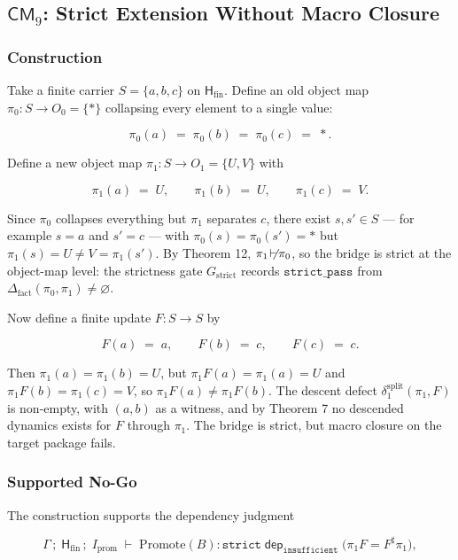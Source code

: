 \documentclass[11pt]{article}
\providecommand{\factor}{\mathrel{\!\vdash\!}}
\theoremstyle{definition}
\begin{document}
\subsection{\texorpdfstring{\(\mathsf{CM}_9\): Strict Extension Without Macro Closure}{C.10 \textbackslash mathsf\{CM\}\_9: Strict Extension Without Macro Closure}}

\subsubsection{Construction}

Take a finite carrier \(S=\{a,b,c\}\) on \(\mathsf H_{\mathrm{fin}}\). Define an old object map \(\pi_0:S\to O_0=\{*\}\) collapsing every element to a single value:

\[
\pi_0(a)\;=\;\pi_0(b)\;=\;\pi_0(c)\;=\;*.
\]

Define a new object map \(\pi_1:S\to O_1=\{U,V\}\) with

\[
\pi_1(a)\;=\;U,\qquad \pi_1(b)\;=\;U,\qquad \pi_1(c)\;=\;V.
\]

Since \(\pi_0\) collapses everything but \(\pi_1\) separates \(c\), there exist \(s,s'\in S\) --- for example \(s=a\) and \(s'=c\) --- with \(\pi_0(s)=\pi_0(s')=*\) but \(\pi_1(s)=U\neq V=\pi_1(s')\). By Theorem 12, \(\pi_1\not\factor\pi_0\), so the bridge is strict at the object-map level: the strictness gate \(G_{\mathrm{strict}}\) records \(\texttt{strict\_pass}\) from \(\Delta_{\mathrm{fact}}(\pi_0,\pi_1)\neq\varnothing\).

Now define a finite update \(F:S\to S\) by

\[
F(a)\;=\;a,\qquad F(b)\;=\;c,\qquad F(c)\;=\;c.
\]

Then \(\pi_1(a)=\pi_1(b)=U\), but \(\pi_1F(a)=\pi_1(a)=U\) and \(\pi_1F(b)=\pi_1(c)=V\), so \(\pi_1F(a)\neq\pi_1F(b)\). The descent defect \(\delta_1^{\mathrm{split}}(\pi_1,F)\) is non-empty, with \((a,b)\) as a witness, and by Theorem 7 no descended dynamics exists for \(F\) through \(\pi_1\). The bridge is strict, but macro closure on the target package fails.

\subsubsection{Supported No-Go}

The construction supports the dependency judgment

\[
\Gamma\,;\;\mathsf H_{\mathrm{fin}}\,;\;I_{\mathrm{prom}}\;\vdash\;\mathrm{Promote}(B):\texttt{strict}\;\mathrel{\mathsf{dep}_{\texttt{insufficient}}}\;\bigl(\pi_1F=F^\sharp\pi_1\bigr),
\]
\end{document}
